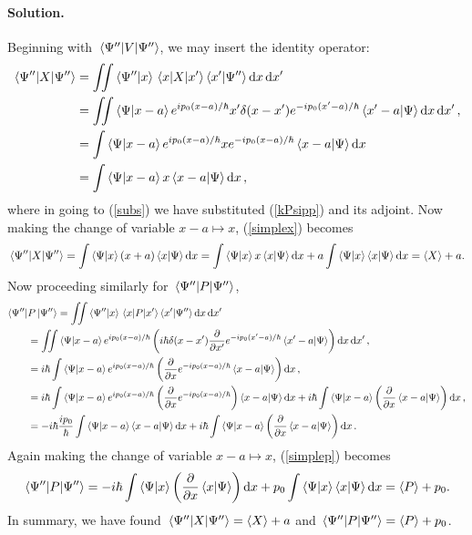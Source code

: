 \documentclass[11pt]{article}
\newcommand{\refeq}[1]{(\ref{#1})}
\newenvironment{solution}
{
    \paragraph{Solution.}
    \ignorespaces
}
{
}
\begin{document}
\begin{solution}
	Beginning with $\ev{V}{\Psi''}$, we may insert the identity operator:
	\begin{align}
		\ev{X}{\Psi''} &= \iint \braket{\Psi''}{x} \mel{x}{X}{x'} \braket{x'}{\Psi''} \dd{x} \dd{x'} \\
		&= \iint \braket{\Psi}{x - a} e^{i \po (x - a) / \hbar} x' \delta(x - x') e^{-i \po (x' - a) / \hbar} \braket{x' - a}{\Psi} \dd{x} \dd{x'}, \label{subs} \\
		&= \int \braket{\Psi}{x - a} e^{i \po (x - a) / \hbar} x e^{-i \po (x - a) / \hbar} \braket{x - a}{\Psi} \dd{x} \\
		&= \int \braket{\Psi}{x - a} x \braket{x - a}{\Psi} \dd{x}, \label{simplex}
	\end{align}
	where in going to \refeq{subs} we have substituted \refeq{kPsipp} and its adjoint.  Now making the change of variable $x - a \mapsto x$, \refeq{simplex} becomes
	\begin{equation}
		\ev{X}{\Psi''} = \int \braket{\Psi}{x} (x + a) \braket{x}{\Psi} \dd{x} = \int \braket{\Psi}{x} x \braket{x}{\Psi} \dd{x} + a \int \braket{\Psi}{x}\braket{x}{\Psi} \dd{x} = \ev{X} + a.
	\end{equation}
	Now proceeding similarly for $\ev{P}{\Psi''}$,
	\begin{align}
		\bra{\Psi''}&{P}\ket{\Psi''} = \iint \braket{\Psi''}{x} \mel{x}{P}{x'} \braket{x'}{\Psi''} \dd{x} \dd{x'} \\
		&= \iint \braket{\Psi}{x - a} e^{i p_0 (x - a) / \hbar} \left( i \hbar \delta(x - x') \pdv{}{x'} e^{-i p_0 (x' - a) / \hbar} \braket{x' - a}{\Psi} \right) \dd{x} \dd{x'}, \\
		&= i \hbar \int \braket{\Psi}{x - a} e^{i p_0 (x - a) / \hbar} \left(\pdv{}{x} e^{-i p_0 (x - a) / \hbar} \braket{x - a}{\Psi} \right) \dd{x}, \\
		&= i \hbar \int \braket{\Psi}{x - a} e^{i p_0 (x - a) / \hbar} \left(\pdv{}{x} e^{-i p_0 (x - a) / \hbar} \right) \braket{x - a}{\Psi} \dd{x} + i \hbar \int \braket{\Psi}{x - a} \left(\pdv{}{x} \braket{x - a}{\Psi} \right) \dd{x}, \\
		&= -i \hbar \frac{i p_0}{\hbar} \int \braket{\Psi}{x - a} \braket{x - a}{\Psi} \dd{x} + i \hbar \int \braket{\Psi}{x - a} \left(\pdv{}{x} \braket{x - a}{\Psi} \right) \dd{x}. \label{simplep}
	\end{align}
	Again making the change of variable $x - a \mapsto x$, \refeq{simplep} becomes
	\begin{equation}
		\ev{P}{\Psi''} = -\ihb \int \braket{\Psi}{x} \left(\pdv{}{x} \braket{x}{\Psi} \right) \dd{x} + \po \int \braket{\Psi}{x} \braket{x}{\Psi} \dd{x} = \ev{P} + \po.
	\end{equation}
	In summary, we have found $\ev{X}{\Psi''} = \ev{X} + a$ and $\ev{P}{\Psi''} = \ev{P} + \po$.
\end{solution}
\end{document}
